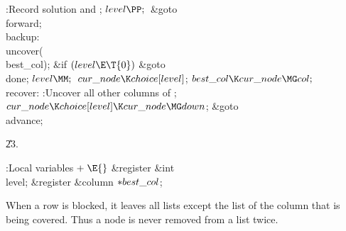 :Record solution and \X;\2\6
${}\\{level}\PP;{}$\6
\&{goto} \\{forward};\6
\4\\{backup}:\5
\\{uncover}(\\{best\_col});\6
\&{if} ${}(\\{level}\E\T{0}){}$\1\5
\&{goto} \\{done};\2\6
${}\\{level}\MM;{}$\6
${}\\{cur\_node}\K\\{choice}[\\{level}]{}$;\5
${}\\{best\_col}\K\\{cur\_node}\MG\\{col};{}$\6
\4\\{recover}:\5
:Uncover all other columns of \X;\6
${}\\{cur\_node}\K\\{choice}[\\{level}]\K\\{cur\_node}\MG\\{down}{}$;\5
\&{goto} \\{advance};\par
\U23.\fi

\B{}:Local variables\X${}\mathrel+\E{}$\6
\&{register} \&{int} \\{level};\6
\&{register} \&{column} ${}{*}\\{best\_col}{}$;\par
\fi

When a row is blocked, it leaves all lists except the list of the
column that is being covered. Thus a node is never removed from a list
twice.

